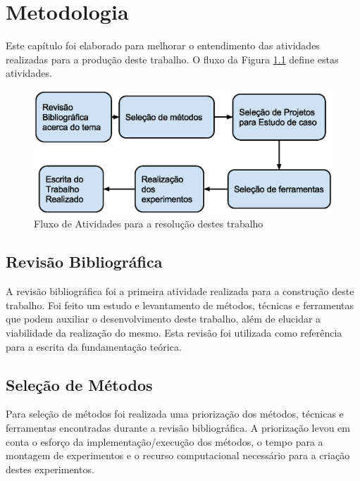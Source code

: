 \chapter[Metodologia]{Metodologia}


Este capítulo foi elaborado para melhorar o entendimento das atividades
 realizadas para a produção deste trabalho. O fluxo da Figura 
\ref{fig:fases_metodologia} define estas atividades.

\begin{figure}[h]
    \centering
        \includegraphics[keepaspectratio=true,scale=0.7]{figuras/fases_metodologia.eps}
    \caption{Fluxo de Atividades para a resolução destes trabalho}
    \label{fig:fases_metodologia}
\end{figure}


\section{Revisão Bibliográfica}

A revisão bibliográfica foi a primeira atividade realizada para a construção
 deste trabalho. Foi feito um estudo e levantamento de métodos, técnicas e
 ferramentas que podem auxiliar o desenvolvimento deste trabalho, além de
 elucidar a viabilidade da realização do mesmo. Esta revisão foi utilizada
 como referência para a  escrita da fundamentação teórica.

\section{Seleção de Métodos}

Para seleção de métodos foi realizada uma priorização dos métodos, técnicas e
 ferramentas encontradas durante a revisão bibliográfica. A priorização levou
 em conta o esforço da implementação/execução dos métodos, o tempo para a
 montagem de experimentos e o recurso computacional necessário para a criação
 destes experimentos.

